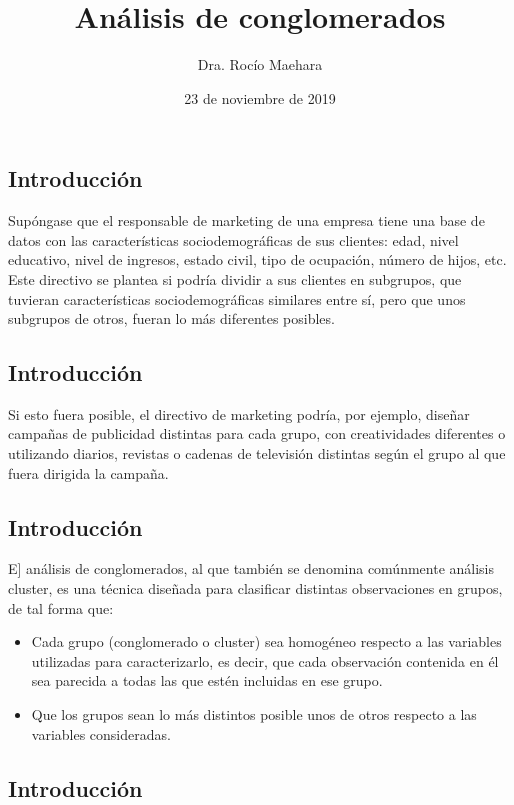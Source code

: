 \documentclass[]{article}
\title{\textbf{Análisis de conglomerados}}
\author{Dra. Rocío Maehara}
\date{23 de noviembre de 2019}
\begin{document}
\maketitle

\subsection{Introducción}\label{introducciuxf3n}

Supóngase que el responsable de marketing de una empresa tiene una base
de datos con las {características sociodemográficas de sus clientes}:
{edad}, {nivel educativo}, {nivel de ingresos}, {estado civil}, {tipo de
ocupación}, {número de hijos}, etc. Este directivo se plantea si podría
{dividir a sus clientes en subgrupos}, que tuvieran {características
sociodemográficas similares entre sí}, pero que {unos subgrupos de
otros}, fueran {lo más diferentes posibles}.

\subsection{Introducción}\label{introducciuxf3n-1}

Si esto fuera posible, el directivo de marketing podría, por ejemplo,
{diseñar campañas de publicidad distintas para cada grupo}, con
{creatividades diferentes} o {utilizando diarios, revistas o cadenas de
televisión distintas} según el grupo al que fuera dirigida la campaña.

\subsection{Introducción}\label{introducciuxf3n-2}

E{]} análisis de conglomerados, al que también se denomina comúnmente
análisis cluster, es una técnica diseñada para clasificar distintas
observaciones en grupos, de tal forma que:

\begin{itemize}
\item
  Cada grupo (conglomerado o cluster) sea homogéneo respecto a las
  variables utilizadas para caracterizarlo, es decir, que cada
  observación contenida en él sea parecida a todas las que estén
  incluidas en ese grupo.
\item
  Que los grupos sean lo más distintos posible unos de otros respecto a
  las variables consideradas.
\end{itemize}

\subsection{Introducción}\label{introducciuxf3n-3}
\end{document}
